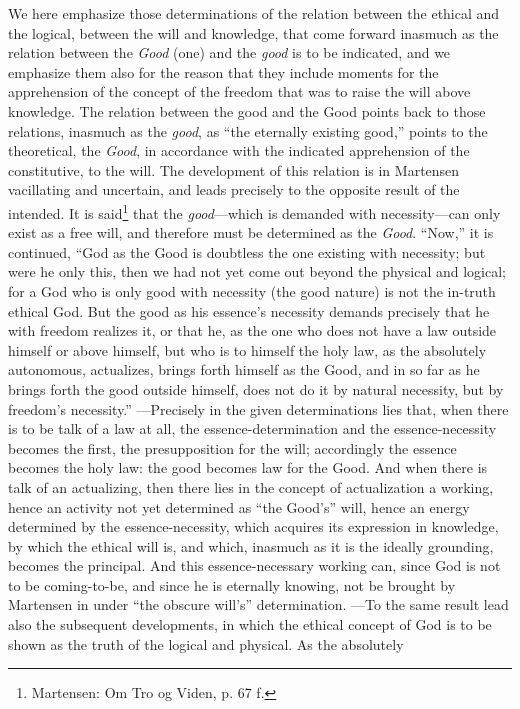 \documentclass[12pt,a4paper]{book}
\begin{document}
We here emphasize those determinations of the relation between the ethical and the
logical, between the will and knowledge, that come forward inasmuch as the relation
between the \emph{Good} (one) and the \emph{good} is to be indicated, and we emphasize them also for
the reason that they include moments for the apprehension of the concept of the
freedom that was to raise the will above knowledge. The relation between the good and
the Good points back to those relations, inasmuch as the \emph{good}, as ``the eternally
existing good,'' points to the theoretical, the \emph{Good}, in accordance with the indicated
apprehension of the constitutive, to the will. The development of this relation is in
Martensen vacillating and uncertain, and leads precisely to the opposite result of the
intended. It is said\footnote{Martensen: Om Tro og Viden, p. 67 f.} that the \emph{good}---which
is demanded with necessity---can only exist as a free will, and therefore must be
determined as the \emph{Good}. ``Now,'' it is continued, ``God as the Good is doubtless the
one existing with necessity; but were he only this, then we had not yet come out beyond
the physical and logical; for a God who is only good with necessity (the good nature) is
not the in-truth ethical God. But the good as his essence's necessity demands precisely
that he with freedom realizes it, or that he, as the one who does not have a law outside
himself or above himself, but who is to himself the holy law, as the absolutely
autonomous, actualizes, brings forth himself as the Good, and in so far as he brings
forth the good outside himself, does not do it by natural necessity, but by freedom's
necessity.'' ---Precisely in the given determinations lies that, when there is to be
talk of a law at all, the essence-determination and the essence-necessity becomes the
first, the presupposition for the will; accordingly the essence becomes the holy law:
the good becomes law for the Good. And when there is talk of an actualizing, then there
lies in the concept of actualization a working, hence an activity not yet determined as
``the Good's'' will, hence an energy determined by the essence-necessity, which acquires
its expression in knowledge, by which the ethical will is, and which, inasmuch as it is
the ideally grounding, becomes the principal. And this essence-necessary working can,
since God is not to be coming-to-be, and since he is eternally knowing, not be brought
by Martensen in under ``the obscure will's'' determination.
---To the same result lead also the subsequent developments, in which the ethical concept
of God is to be shown as the truth of the logical and physical. As the absolutely
\end{document}
